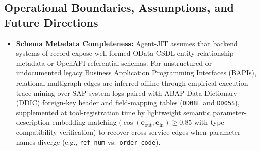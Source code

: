 \documentclass[conference,10pt]{IEEEtran}
\begin{document}
\subsection{Operational Boundaries, Assumptions, and Future Directions}
\begin{itemize}
    \item \textbf{Schema Metadata Completeness:} Agent-JIT assumes that backend systems of record expose well-formed OData CSDL entity relationship metadata or OpenAPI referential schemas. For unstructured or undocumented legacy Business Application Programming Interfaces (BAPIs), relational multigraph edges are inferred offline through empirical execution trace mining over SAP system logs paired with ABAP Data Dictionary (DDIC) foreign-key header and field-mapping tables (\texttt{DD08L} and \texttt{DD05S}), supplemented at tool-registration time by lightweight semantic parameter-description embedding matching ($\cos(\mathbf{e}_{\text{out}}, \mathbf{e}_{\text{in}}) \ge 0.85$ with type-compatibility verification) to recover cross-service edges when parameter names diverge (e.g., \texttt{ref\_num} vs.\ \texttt{order\_code}).

\end{itemize}
\end{document}
